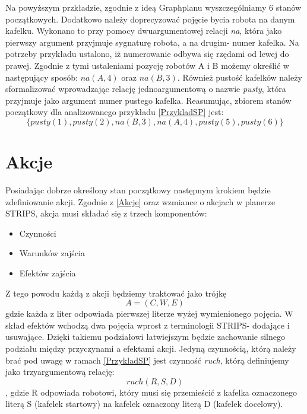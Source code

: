     Na powyższym przkładzie, zgodnie z ideą Graphplanu wyszczególniamy 6 stanów początkowych. Dodatkowo należy doprecyzować pojęcie bycia robota na danym kafelku. Wykonano to 
    przy pomocy dwuargumentowej relacji \textit{na}, która jako pierwszy argument przyjmuje sygnaturę robota, a na drugim- numer kafelka. Na potrzeby przykładu ustalono, iż 
    numerowanie odbywa się rzędami od lewej do prawej. Zgodnie z tymi ustaleniami pozycję robotów A i B możemy określić w następujący sposób: \textit{$na(A,4)$} oraz 
    \textit{$na(B,3)$}. Również pustość kafelków należy sformalizować wprowadzając relację jednoargumentową o nazwie \textit{pusty}, która przyjmuje jako argument numer
    pustego kafelka. Reasumując, zbiorem stanów początkowy dla analizowanego przykładu \ref{PrzykladSP} jest: 
    \begin{equation}
        \{pusty(1),pusty(2),na(B,3),na(A,4),pusty(5),pusty(6)\}
        \label{ZbiorPoczatkowy}
    \end{equation}
\section{Akcje}
    Posiadając dobrze określony stan początkowy następnym krokiem będzie zdefiniowanie akcji. Zgodnie z \ref{Akcje} oraz wzmiance o akcjach w planerze STRIPS,
    akcja musi składać się z trzech komponentów:
    \begin{itemize}
        \item Czynności
        \item Warunków zajścia
        \item Efektów zajścia
    \end{itemize}
    Z tego powodu każdą z akcji będziemy traktować jako trójkę 
    \begin{equation}
        A=(C,W,E)
    \end{equation}
    gdzie każda z liter odpowiada pierwszej literze wyżej wymienionego pojęcia. 
    W skład efektów wchodzą dwa pojęcia wprost z terminologii STRIPS- dodające i usuwające. Dzięki takiemu podziałowi łatwiejszym będzie 
    zachowanie silnego podziału między przyczynami a efektami akcji. 
    Jedyną czynnością, którą należy brać pod uwagę w ramach \ref{PrzykladSP} jest czynność \textit{ruch}, którą definiujemy jako trzyargumentową relację:
    \begin{equation}
        ruch(R,S,D)
    \end{equation}
    , gdzie R odpowiada robotowi, który musi się przemieścić z kafelka oznaczonego literą S (kafelek startowy) na kafelek oznaczony
    literą D (kafelek docelowy).
    
